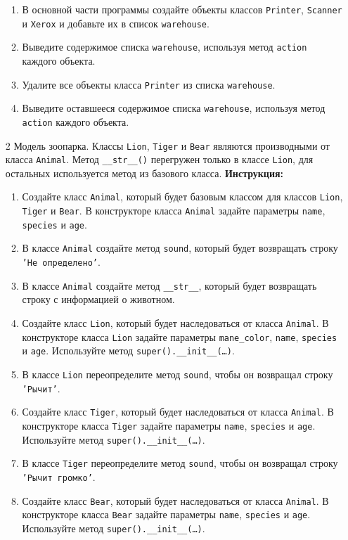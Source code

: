 \begin{enumerate}
\begin{enumerate}
    \item В основной части программы создайте объекты классов \texttt{Printer}, \texttt{Scanner} и \texttt{Xerox} и добавьте их в список \texttt{warehouse}.
    \item Выведите содержимое списка \texttt{warehouse}, используя метод \texttt{action} каждого объекта.
    \item Удалите все объекты класса \texttt{Printer} из списка \texttt{warehouse}.
    \item Выведите оставшееся содержимое списка \texttt{warehouse}, используя метод \texttt{action} каждого объекта.
\end{enumerate}
\item[2]
Модель зоопарка. Классы \texttt{Lion}, \texttt{Tiger} и \texttt{Bear} являются производными от класса \texttt{Animal}. Метод \texttt{\_\_str\_\_()} перегружен только в классе \texttt{Lion}, для остальных используется метод из базового класса.
\textbf{Инструкция:}
\begin{enumerate}
    \item Создайте класс \texttt{Animal}, который будет базовым классом для классов \texttt{Lion}, \texttt{Tiger} и \texttt{Bear}. В конструкторе класса \texttt{Animal} задайте параметры \texttt{name}, \texttt{species} и \texttt{age}.
    \item В классе \texttt{Animal} создайте метод \texttt{sound}, который будет возвращать строку \texttt{'Не определено'}.
    \item В классе \texttt{Animal} создайте метод \texttt{\_\_str\_\_}, который будет возвращать строку с информацией о животном.
    \item Создайте класс \texttt{Lion}, который будет наследоваться от класса \texttt{Animal}. В конструкторе класса \texttt{Lion} задайте параметры \texttt{mane\_color}, \texttt{name}, \texttt{species} и \texttt{age}. Используйте метод \texttt{super().\_\_init\_\_(\ldots)}.
    \item В классе \texttt{Lion} переопределите метод \texttt{sound}, чтобы он возвращал строку \texttt{'Рычит'}.
    \item Создайте класс \texttt{Tiger}, который будет наследоваться от класса \texttt{Animal}. В конструкторе класса \texttt{Tiger} задайте параметры \texttt{name}, \texttt{species} и \texttt{age}. Используйте метод \texttt{super().\_\_init\_\_(\ldots)}.
    \item В классе \texttt{Tiger} переопределите метод \texttt{sound}, чтобы он возвращал строку \texttt{'Рычит громко'}.
    \item Создайте класс \texttt{Bear}, который будет наследоваться от класса \texttt{Animal}. В конструкторе класса \texttt{Bear} задайте параметры \texttt{name}, \texttt{species} и \texttt{age}. Используйте метод \texttt{super().\_\_init\_\_(\ldots)}.

\end{enumerate}
\end{enumerate}
